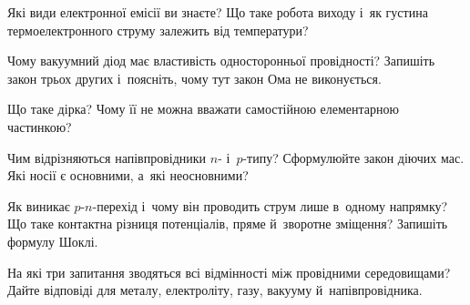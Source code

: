 \begin{Questions}
\begin{quizlist}
		\item Які види електронної емісії ви знаєте? Що таке робота виходу і~як густина
		  термоелектронного струму залежить від температури?
		\item Чому вакуумний діод має властивість односторонньої провідності? Запишіть
		  закон трьох других і~поясніть, чому тут закон Ома не виконується.
		\item Що таке дірка? Чому її не можна вважати самостійною елементарною частинкою?
		\item Чим відрізняються напівпровідники $n$- і~$p$-типу? Сформулюйте закон діючих
		  мас. Які носії є основними, а~які неосновними?
		\item Як виникає $p$-$n$-перехід і~чому він проводить струм лише в~одному
		  напрямку? Що таке контактна різниця потенціалів, пряме й~зворотне зміщення?
		  Запишіть формулу Шоклі.
		\item На які три запитання зводяться всі відмінності між провідними середовищами?
		  Дайте відповіді для металу, електроліту, газу, вакууму й~напівпровідника.
	\end{quizlist}
\end{Questions}

